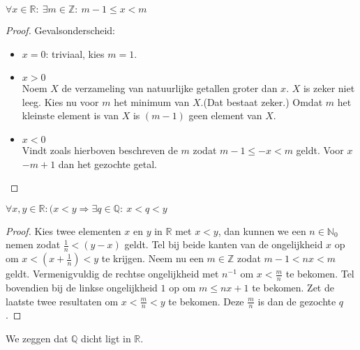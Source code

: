 \documentclass[main.tex]{subfiles}
\begin{document}
\begin{gev}
  \label{gev:z-omsluit-elk-r}
  $\forall x\in \mathbb{R}:\ \exists m \in \mathbb{Z}:\ m-1 \le x < m$

  \begin{proof}
    Gevalsonderscheid:
    \begin{itemize}
    \item $x = 0$: triviaal, kies $m=1$.
    \item $x > 0$\\
      Noem $X$ de verzameling van natuurlijke getallen groter dan $x$.
      $X$ is zeker niet leeg.
      Kies nu voor $m$ het minimum van $X$.(Dat bestaat zeker.) \waarom
      Omdat $m$ het kleinste element is van $X$ is $(m-1)$ geen element van $X$.
    \item $x < 0$\\
      Vindt zoals hierboven beschreven de $m$ zodat $m-1 \le -x < m$ geldt.
      Voor $x$ $-m+1$ dan het gezochte getal.\waarom
    \end{itemize}
  \end{proof}
\end{gev}

\begin{pr}
  \label{pr:q-dicht-in-r}
  $\forall x,y \in \mathbb{R}: (x<y \Rightarrow \exists q\in \mathbb{Q}:\ x<q<y$

  \begin{proof}
    Kies twee elementen $x$ en $y$ in $\mathbb{R}$ met $x<y$, dan kunnen we een $n\in \mathbb{N}_{0}$ nemen zodat $\frac{1}{n}< (y-x)$ geldt.
    Tel bij beide kanten van de ongelijkheid $x$ op om $x<\left(x+\frac{1}{n}\right)<y$ te krijgen.
    Neem nu een $m\in \mathbb{Z}$ zodat $m-1<nx<m$ geldt.
    Vermenigvuldig de rechtse ongelijkheid met $n^{-1}$ om $x< \frac{m}{n}$ te bekomen.
    Tel bovendien bij de linkse ongelijkheid $1$ op om $m \le nx+1$ te bekomen.
    Zet de laatste twee resultaten om $x < \frac{m}{n} < y$ te bekomen.
    Deze $\frac{m}{n}$ is dan de gezochte $q$.
  \end{proof}
\end{pr}

\begin{opm}
  We zeggen dat $\mathbb{Q}$ dicht ligt in $\mathbb{R}$.
\end{opm}
\end{document}
